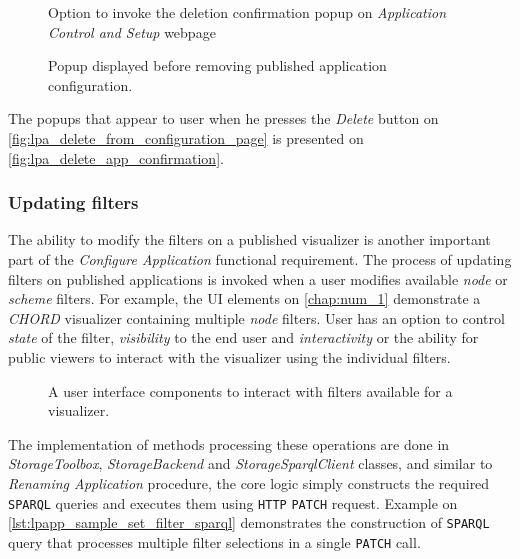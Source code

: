 \begin{figure}[hbt]
  \caption{Option to invoke the deletion confirmation popup on \textit{Application Control and Setup} webpage}
  \label{fig:lpa_delete_from_configuration_page}
\endminipage\hfill
{}
  \caption{Popup displayed before removing published application configuration.}
  \label{fig:lpa_delete_app_confirmation}
\endminipage\hfill
\end{figure}

The popups that appear to user when he presses the \textit{Delete} button on \autoref{fig:lpa_delete_from_configuration_page} is presented on \autoref{fig:lpa_delete_app_confirmation}.

\subsubsection{Updating filters}
\label{ssssec:updating_filters_implementation}

The ability to modify the filters on a published visualizer is another important part of the \textit{Configure Application} functional requirement. The process of updating filters on published applications is invoked when a user modifies available \textit{node} or \textit{scheme} filters. For example, the UI elements on \autoref{chap:num_1} demonstrate a \textit{CHORD} visualizer containing multiple \textit{node} filters. User has an option to control \textit{state} of the filter, \textit{visibility} to the end user and \textit{interactivity} or the ability for public viewers to interact with the visualizer using the individual filters. 

\begin{figure}[h]
\centering
{}
\caption{A user interface components to interact with filters available for a visualizer.}
\label{fig:lpa_filters_interactions}
\end{figure}


The implementation of methods processing these operations are done in \textit{StorageToolbox}, \textit{StorageBackend} and \textit{StorageSparqlClient} classes, and similar to \textit{Renaming Application} procedure, the core logic simply constructs the required \texttt{SPARQL} queries and executes them using \texttt{HTTP} \texttt{PATCH} request. Example on \autoref{lst:lpapp_sample_set_filter_sparql} demonstrates the construction of \texttt{SPARQL} query that processes multiple filter selections in a single \texttt{PATCH} call.  


